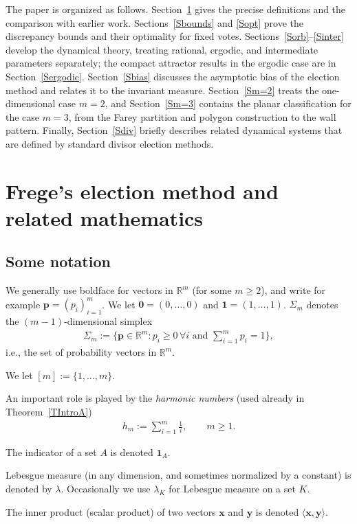 \documentclass[11pt,reqno,tbtags,a4paper]{amsart}
\numberwithin{equation}{section}
\renewcommand\ge{\geq}
\renewcommand\geq{\geqslant}
\theoremstyle{plain}%
\theoremstyle{definition}
\theoremstyle{remark}
\newcommand{\refT}[1]{Theorem~\ref{#1}}
\newcommand{\sumim}{\sum_{i=1}^m}
\newcommand\set[1]{\ensuremath{\{#1\}}}
\newcommand\biggset[1]{\ensuremath{\biggl\{#1\biggr\}}}
\newcommand\innprod[1]{\langle#1\rangle}
\newcommand\bbR{\mathbb R}
\newcounter{cc}
\newcommand\gl{\lambda}
\newcommand\gS{\Sigma}
\newcommand\etta{\boldsymbol1}
\newcommand\vp{\mathbf{p}}
\newcommand\vx{\mathbf{x}}
\newcommand\vy{\mathbf{y}}
\newcommand\0{{\boldsymbol 0}}
\newcommand\1{{\boldsymbol 1}}
\begin{document}
The paper is organized as follows. Section~\ref{SFrege} gives the precise
definitions and the comparison with earlier work.
Sections~\ref{Sbounds} and \ref{Sopt} prove the discrepancy bounds and
their optimality for fixed votes. Sections~\ref{Sorb}--\ref{Sinter}
develop the dynamical theory, treating rational, ergodic, and intermediate
parameters separately; the compact attractor results in the ergodic case are in
Section~\ref{Sergodic}. Section~\ref{Sbias} discusses
the asymptotic bias of the election method and
relates it to the invariant measure.
Section~\ref{Sm=2}
treats the one-dimensional case $m=2$, and
Section~\ref{Sm=3} contains the planar classification for the case $m=3$,
from the Farey partition and polygon construction to the
wall pattern. 
Finally, Section~\ref{Sdiv} briefly describes related dynamical
systems that are defined by standard
divisor election methods.


\section{Frege's election method and related mathematics}\label{SFrege}

\subsection{Some notation}\label{SSnot}
We generally use boldface for vectors in $\bbR^m$ (for some $m\ge2$), 
and write for example $\vp=(p_i)_{i=1}^m$. 
We let $\0=(0,\dots,0)$ and $\1=(1,\dots,1)$.
$\gS_m$ denotes the  $(m-1)$-dimensional simplex
\begin{align}
\gS_m:=\biggset{\vp\in\bbR^m:p_i\ge0\,\forall i   \text{ and } \sumim p_i=1},
\end{align}
i.e., the set of probability vectors in $\bbR^m$.

We let $[m]:=\set{1,\dots,m}$.

An important role is played by the \emph{harmonic numbers}
(used already in \refT{TIntroA})
\begin{align}
  h_m:=\sum_{i=1}^m \frac{1}{i}, \qquad m\ge1. 
\end{align}

The indicator of a set $A$ is denoted $\etta_A$.

Lebesgue measure (in any dimension, and sometimes normalized by a constant) 
is denoted by $\gl$.
Occasionally we use $\gl_K$ for Lebesgue measure on a set $K$.

The inner product (scalar product) of two vectors $\vx$ and $\vy$ is denoted
$\innprod{\vx,\vy}$.
\end{document}
